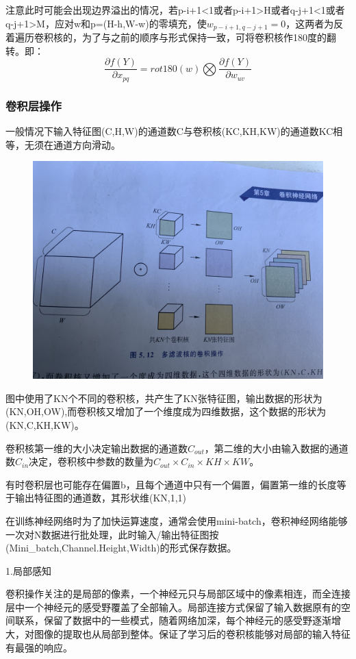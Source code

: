 \documentclass[openbib]{article}
\begin{document}
注意此时可能会出现边界溢出的情况，若p-i+1<1或者p-i+1>H或者q-j+1<1或者q-j+1>M，应对w和p=(H-h,W-w)的零填充，使$w_{p-i+1,q-j+1}=0$，这两者为反着遍历卷积核的，为了与之前的顺序与形式保持一致，可将卷积核作180度的翻转。即：
$$\frac{\partial f(Y)}{\partial x_{pq}}=rot180(w)\bigotimes \frac{\partial f(Y)}{\partial w_{uv}}$$

\subsubsection{卷积层操作}
一般情况下输入特征图(C,H,W)的通道数C与卷积核(KC,KH,KW)的通道数KC相等，无须在通道方向滑动。

\begin{figure}[htbp]
	\centering
	\includegraphics[scale=0.08]{多滤波核的卷积操作}
\end{figure}
图中使用了KN个不同的卷积核，共产生了KN张特征图，输出数据的形状为(KN,OH,OW),而卷积核又增加了一个维度成为四维数据，这个数据的形状为(KN,C,KH,KW)。

卷积核第一维的大小决定输出数据的通道数$C_{out}$，第二维的大小由输入数据的通道数$C_{in}$决定，卷积核中参数的数量为$C_{out}\times C_{in}\times KH\times KW$。

有时卷积层也可能存在偏置b，且每个通道中只有一个偏置，偏置第一维的长度等于输出特征图的通道数，其形状维(KN,1,1)

在训练神经网络时为了加快运算速度，通常会使用mini-batch，卷积神经网络能够一次对N数据进行批处理，此时输入/输出特征图按(Mini\_batch,Channel.Height,Width)的形式保存数据。

1.局部感知

卷积操作关注的是局部的像素，一个神经元只与局部区域中的像素相连，而全连接层中一个神经元的感受野覆盖了全部输入。局部连接方式保留了输入数据原有的空间联系，保留了数据中的一些模式，随着网络加深，每个神经元的感受野逐渐增大，对图像的提取也从局部到整体。保证了学习后的卷积核能够对局部的输入特征有最强的响应。
\end{document}
